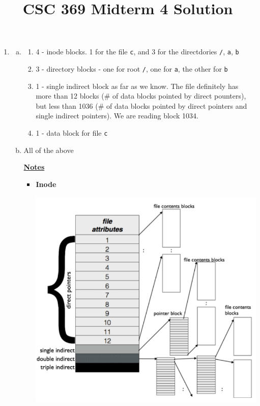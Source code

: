 \documentclass[12pt]{article}
\begin{document}
\title{CSC 369 Midterm 4 Solution}

\bigskip

\begin{enumerate}[1.]
    \item

    \begin{enumerate}[a)]

        \item
        \begin{enumerate}[1)]
            \item 4 - inode blocks. 1 for the file \texttt{c}, and 3 for the
            directdories \texttt{/}, \texttt{a}, \texttt{b}

            \item 3 - directory blocks - one for root \texttt{/}, one for \texttt{a},
            the other for \texttt{b}

            \item 1 - single indirect block as far as we know. The file definitely has more than
            12 blocks (\# of data blocks pointed by direct pounters), but less than 1036 (\# of data blocks pointed
            by direct pointers and single indirect pointers). We are reading block 1034.

            \item 1 - data block for file \texttt{c}
        \end{enumerate}

        \item

        All of the above

        \bigskip

        \underline{\textbf{Notes}}

        \begin{itemize}
            \item \textbf{Inode}

            \begin{center}
            \includegraphics[width=0.6\linewidth]{../images/midterm_4_solution_1.png}
            \end{center}


\end{itemize}
\end{enumerate}
\end{enumerate}
\end{document}
